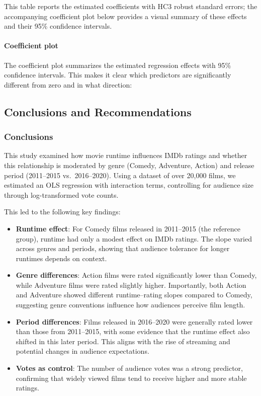 \documentclass[
]{article}
\providecommand{\tightlist}{%
  \setlength{\itemsep}{0pt}\setlength{\parskip}{0pt}}
\begin{document}
This table reports the estimated coefficients with HC3 robust standard
errors; the accompanying coefficient plot below provides a visual
summary of these effects and their 95\% confidence intervals.

\paragraph{Coefficient plot}\label{coefficient-plot}

The coefficient plot summarizes the estimated regression effects with
95\% confidence intervals. This makes it clear which predictors are
significantly different from zero and in what direction:

\subsection{Conclusions and
Recommendations}\label{conclusions-and-recommendations}

\subsubsection{Conclusions}\label{conclusions}

This study examined how movie runtime influences IMDb ratings and
whether this relationship is moderated by genre (Comedy, Adventure,
Action) and release period (2011--2015 vs.~2016--2020). Using a dataset
of over 20,000 films, we estimated an OLS regression with interaction
terms, controlling for audience size through log-transformed vote
counts.

This led to the following key findings:

\begin{itemize}
\tightlist
\item
  \textbf{Runtime effect}: For Comedy films released in 2011--2015 (the
  reference group), runtime had only a modest effect on IMDb ratings.
  The slope varied across genres and periods, showing that audience
  tolerance for longer runtimes depends on context.\\
\item
  \textbf{Genre differences}: Action films were rated significantly
  lower than Comedy, while Adventure films were rated slightly higher.
  Importantly, both Action and Adventure showed different
  runtime--rating slopes compared to Comedy, suggesting genre
  conventions influence how audiences perceive film length.\\
\item
  \textbf{Period differences}: Films released in 2016--2020 were
  generally rated lower than those from 2011--2015, with some evidence
  that the runtime effect also shifted in this later period. This aligns
  with the rise of streaming and potential changes in audience
  expectations.\\
\item
  \textbf{Votes as control}: The number of audience votes was a strong
  predictor, confirming that widely viewed films tend to receive higher
  and more stable ratings.
\end{itemize}
\end{document}
